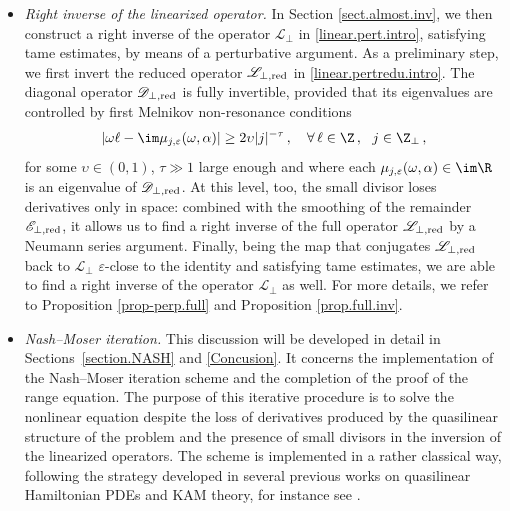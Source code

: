 \documentclass[a4paper,reqno,10pt]{article}
\newcommand{\sL}{\mathscr{L}}
\newcommand{\sE}{\mathscr{E}}
\newcommand{\sD}{\mathscr{D}}
\begin{document}
\begin{itemize}
    \item [(ii)] {\it Right inverse of the linearized operator.} In Section \ref{sect.almost.inv}, we then construct a right inverse of the operator $\sL_{\perp}$ in \eqref{linear.pert.intro}, satisfying tame estimates,  by means of a perturbative argument. 
    As a preliminary step, we first invert the reduced operator $\sL_{\perp,{\rm red}}$ in \eqref{linear.pertredu.intro}. The diagonal operator $\sD_{\perp,{\rm red}}$ is fully invertible,
    provided that its eigenvalues are controlled by first Melnikov non-resonance conditions
    \begin{equation}
        |\omega\ell - \im \mu_{j,\varepsilon}(\omega,\alpha)| \geq 2\upsilon |j|^{-\tau} \,, \quad \forall\, \ell \in \Z\,, \ \ j \in \Z_\perp \,,
    \end{equation}
    for some $\upsilon\in (0,1)$, $\tau\gg1$ large enough and where each $\mu_{j,\varepsilon}(\omega,\alpha)\in \im \R$ is an eigenvalue of $\sD_{\perp,{\rm red}}$. At this level, too, the small divisor loses derivatives only in space: combined with the smoothing of the remainder $\sE_{\perp,{\rm red}}$, it allows us to find a right inverse of the full operator $\sL_{\perp,{\rm red}}$ by a Neumann series argument. Finally, being the map that conjugates $\sL_{\perp,{\rm red}}$ back to $\sL_{\perp}$ $\varepsilon$-close to the identity and satisfying tame estimates, we are able to find a right inverse of the operator $\sL_{\perp}$ as well.
    For more details, we refer to Proposition \ref{prop-perp.full} and Proposition \ref{prop.full.inv}.
    \item [(iii)] {\it Nash--Moser iteration.}
    This discussion will be developed in detail in Sections~\ref{section.NASH} and \ref{Concusion}. It concerns the implementation of the Nash--Moser iteration scheme and the completion of the proof of the range equation. The purpose of this iterative procedure is to solve the nonlinear equation despite the loss of derivatives produced by the quasilinear structure of the problem and the presence of small divisors in the inversion of the linearized operators. The scheme is implemented in a rather classical way, following the strategy developed in several previous works on quasilinear Hamiltonian PDEs and KAM theory, for instance see \cite{BBHM,HHM24}.  


\end{itemize}
\end{document}

